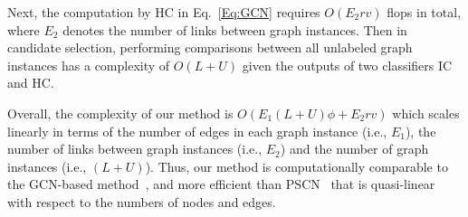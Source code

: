 \documentclass[sigconf]{acmart}
\begin{document}
Next, the computation by HC in Eq.~\eqref{Eq:GCN} requires $O(E_2rv)$ flops in total, where $E_2$ denotes the number of links between graph instances.  Then in candidate selection, performing comparisons between all unlabeled graph instances has a complexity of $O(L+U)$ given the outputs of two classifiers IC and HC.

Overall, the complexity of our method is $O(E_1(L+U)\phi+E_2rv)$ which scales linearly in terms of the number of edges in each graph instance (i.e., $E_1$), the number of links between graph instances (i.e., $E_2$) and the number of graph instances (i.e., $(L+U)$).  Thus, our method is computationally comparable to the GCN-based method~\cite{kipf2017semi}, and more efficient than PSCN~\cite{Niepert2016LearningCN} that is quasi-linear with respect to the numbers of nodes and edges.
\end{document}

